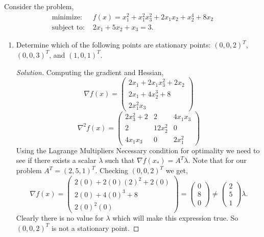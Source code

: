 \documentclass[12pt]{article}
\makeatletter
\theoremstyle{homework}
\newenvironment{exercise}[1]
{\def\@currentlabel{#1}\exercisecore}
{\endexercisecore}
\makeatother
\begin{document}
\begin{exercise}{2.1} Consider the problem, 
  \begin{align*}
    \text{minimize:  } &f(x) = x_1^2 + x_1^2x_3^2 + 2x_1x_2 + x_2^4 + 8x_2\\
    \text{subject to:  } &2x_1 + 5x_2 + x_3 = 3.
  \end{align*}
  \begin{enumerate}
    \item[(i)] Determine which of the following points are stationary points: $(0, 0, 2)^T$, $(0, 0, 3)^T$, and $(1, 0, 1)^T$. 
    \begin{proof}[Solution] Computing the gradient and Hessian, 
      \begin{equation*}
        \nabla f(x) = 
        \begin{pmatrix}
          2x_1 + 2x_1x_3^2 + 2x_2\\
          2x_1 + 4x_2^3 + 8\\
          2x_1^2x_3
        \end{pmatrix}
      \end{equation*}
      \begin{equation*}
        \nabla^2 f(x) = 
        \begin{pmatrix}
          2x_3^2 + 2 & 2 & 4x_1x_3\\
          2 & 12x_2^2 & 0\\
          4x_1x_3 & 0 & 2x_1^2
        \end{pmatrix}
      \end{equation*}
      Using the Lagrange Multipliers Necessary condition for optimality we need to see if there exists 
      a scalar $\lambda$ such that $\nabla f(x_*) = A^T\lambda$. Note that for our problem $A^T = (2, 5, 1)^T$. 
      Checking $(0, 0, 2)^T$ we get, 
      \begin{equation*}
        \nabla f(x) = 
        \begin{pmatrix}
          2(0) + 2(0)(2)^2 + 2(0)\\
          2(0) + 4(0)^3 + 8\\
          2(0)^2(0)
        \end{pmatrix} =         \begin{pmatrix}
          0\\
          8\\
          0
        \end{pmatrix}
        \neq
        \begin{pmatrix}
          2\\
          5\\
          1
        \end{pmatrix}
        \lambda.
      \end{equation*}
      Clearly there is no value for $\lambda$ which will make this expression true. So $(0, 0, 2)^T$
      is not a stationary point.


\end{proof}
\end{enumerate}
\end{exercise}
\end{document}
